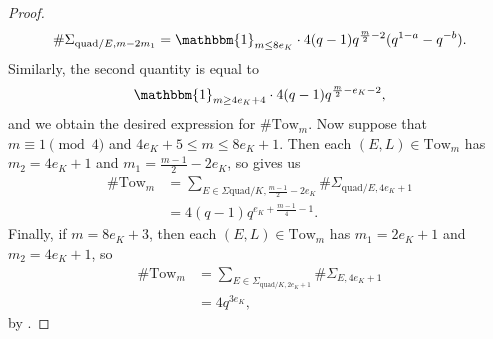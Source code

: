 \documentclass[11pt]{amsart}
\theoremstyle{theorem}
\theoremstyle{example}
\theoremstyle{definition}
\numberwithin{theorem}{section}
\numberwithin{theorem}{section}
\newcommand{\quadr}{\mathrm{quad}}
\newcommand{\Tow}{\mathrm{Tow}}
\begin{document}
\begin{proof}
    $$
    \#\Sigma_{\quadr/E, m - 2m_1} = \mathbbm{1}_{m \leq 8e_K} \cdot 4(q-1)q^{\frac{m}{2} - 2}(q^{1-a} - q^{-b}).
    $$
    Similarly, the second quantity is equal to
    $$
    \mathbbm{1}_{m \geq 4e_K + 4}\cdot 4(q-1) q^{\frac{m}{2} - e_K - 2},
    $$
    and we obtain the desired expression for $\# \Tow_m$. Now suppose that $m\equiv 1\pmod{4}$ and $4e_K + 5 \leq m \leq 8e_K + 1$. Then each $(E,L) \in \Tow_m$ has $m_2 = 4e_K + 1$ and $m_1 = \frac{m-1}{2} - 2e_K$, so \cite[Lemma~4.3]{tunnell} gives us
    \begin{align*}
    \# \Tow_m &= \sum_{E \in \Sigma{\quadr/K,\frac{m-1}{2}-2e_K}} \#\Sigma_{\quadr/E,4e_K+1}
    \\
    &= 4(q-1)q^{e_K + \frac{m-1}{4} - 1}.
    \end{align*}
    Finally, if $m = 8e_K + 3$, then each $(E,L) \in \Tow_m$ has $m_1 = 2e_K + 1$ and $m_2 = 4e_K + 1$, so 
    \begin{align*}
    \# \Tow_m &= \sum_{E\in \Sigma_{\quadr/K,2e_K+1}} \#\Sigma_{E,4e_K + 1}
    \\
    &= 4q^{3e_K},
    \end{align*}
    by \cite[Lemma~4.3]{tunnell}.
\end{proof}
\end{document}
